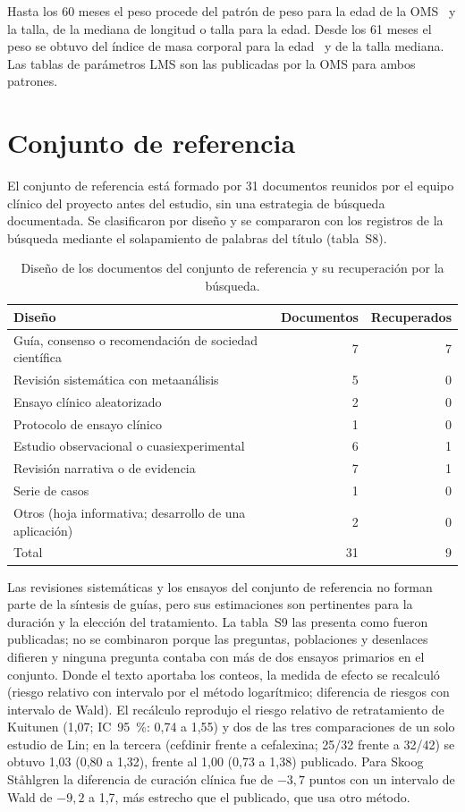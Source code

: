 \documentclass[10pt,a4paper]{article}
\begin{document}
Hasta los 60 meses el peso procede del patrón de peso para la edad de la OMS~\citep{mgrs2006} y la talla, de la mediana de longitud o talla para la edad. Desde los 61 meses el peso se obtuvo del índice de masa corporal para la edad~\citep{deonis2007} y de la talla mediana. Las tablas de parámetros LMS son las publicadas por la OMS para ambos patrones.

\section{Conjunto de referencia}

El conjunto de referencia está formado por 31 documentos reunidos por el equipo clínico del proyecto antes del estudio, sin una estrategia de búsqueda documentada. Se clasificaron por diseño y se compararon con los registros de la búsqueda mediante el solapamiento de palabras del título (tabla~S8).

\begin{table}[htbp]
\centering
\caption{Diseño de los documentos del conjunto de referencia y su recuperación por la búsqueda.}
\small
\begin{tabular}{@{}lrr@{}}
\toprule
Diseño & Documentos & Recuperados \\
\midrule
Guía, consenso o recomendación de sociedad científica & 7 & 7 \\
Revisión sistemática con metaanálisis & 5 & 0 \\
Ensayo clínico aleatorizado & 2 & 0 \\
Protocolo de ensayo clínico & 1 & 0 \\
Estudio observacional o cuasiexperimental & 6 & 1 \\
Revisión narrativa o de evidencia & 7 & 1 \\
Serie de casos & 1 & 0 \\
Otros (hoja informativa; desarrollo de una aplicación) & 2 & 0 \\
\midrule
Total & 31 & 9 \\
\bottomrule
\end{tabular}
\end{table}

Las revisiones sistemáticas y los ensayos del conjunto de referencia no forman parte de la síntesis de guías, pero sus estimaciones son pertinentes para la duración y la elección del tratamiento. La tabla~S9 las presenta como fueron publicadas; no se combinaron porque las preguntas, poblaciones y desenlaces difieren y ninguna pregunta contaba con más de dos ensayos primarios en el conjunto. Donde el texto aportaba los conteos, la medida de efecto se recalculó (riesgo relativo con intervalo por el método logarítmico; diferencia de riesgos con intervalo de Wald). El recálculo reprodujo el riesgo relativo de retratamiento de Kuitunen (1,07; IC~95~\%: 0,74 a 1,55) y dos de las tres comparaciones de un solo estudio de Lin; en la tercera (cefdinir frente a cefalexina; 25/32 frente a 32/42) se obtuvo 1,03 (0,80 a 1,32), frente al 1,00 (0,73 a 1,38) publicado. Para Skoog Ståhlgren la diferencia de curación clínica fue de $-3{,}7$ puntos con un intervalo de Wald de $-9{,}2$ a 1,7, más estrecho que el publicado, que usa otro método.
\end{document}
